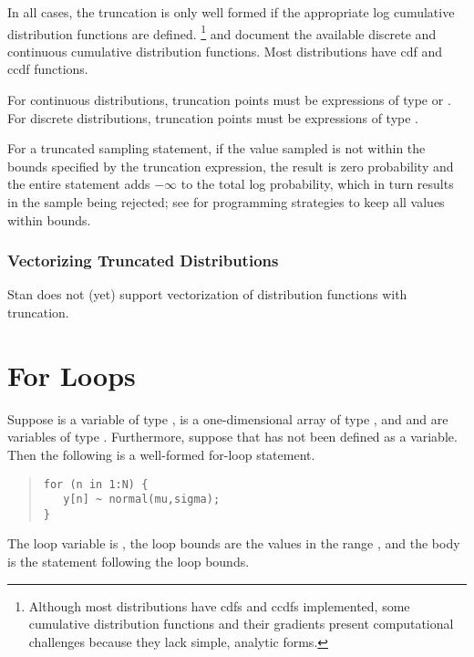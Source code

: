 In all cases, the truncation is only well formed if the
appropriate log cumulative distribution functions are defined.%
%
\footnote{Although most distributions have cdfs and ccdfs implemented,
  some cumulative distribution functions and their gradients present
  computational challenges because they lack simple, analytic forms.}
%
 and
 document the available discrete
and continuous cumulative distribution functions.  Most distributions
have cdf and ccdf functions.

For continuous distributions, truncation points must be expressions of
type  or .  For discrete distributions, truncation
points must be expressions of type .  

For a truncated sampling statement, if the value sampled is not within
the bounds specified by the truncation expression, the result is zero
probability and the entire statement adds $-\infty$ to the total log
probability, which in turn results in the sample being rejected; see
 for programming strategies to keep
all values within bounds.

\subsubsection{Vectorizing Truncated Distributions}

Stan does not (yet) support vectorization of distribution functions
with truncation.





\section{For Loops}

Suppose
 is a variable of type ,  is a
one-dimensional array of type , and  and
 are variables of type .  Furthermore, suppose
that  has not been defined as a variable. Then the following
is a well-formed for-loop statement.
%
\begin{quote}
\begin{Verbatim}[fontsize=\small]
for (n in 1:N) {
   y[n] ~ normal(mu,sigma);
}
\end{Verbatim}
\end{quote}
%
The loop variable is , the loop bounds are the values in the
range , and the body is the statement following the
loop bounds.  

